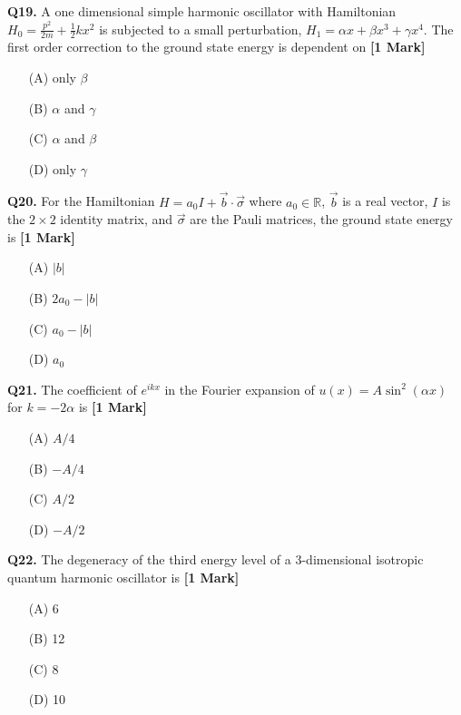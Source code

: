 \documentclass[11pt]{article}
\newcommand{\questiona}[2]{
    \noindent\textbf{Q#2.} #1 \hfill \textbf{[1 Mark]}
}
\begin{document}
\questiona{A one dimensional simple harmonic oscillator with Hamiltonian \( H_0 = \frac{p^2}{2m} + \frac{1}{2}kx^2 \) is subjected to a small perturbation, \( H_1 = \alpha x + \beta x^3 + \gamma x^4 \). The first order correction to the ground state energy is dependent on}{19}
\begin{enumerate}
    \item[(A)] only \( \beta \)
    \item[(B)] \( \alpha \) and \( \gamma \)
    \item[(C)] \( \alpha \) and \( \beta \)
    \item[(D)] only \( \gamma \)
\end{enumerate}
\vspace{0.5cm}

\questiona{For the Hamiltonian \( H = a_0 I + \vec{b} \cdot \vec{\sigma} \) where \( a_0 \in \mathbb{R} \), \( \vec{b} \) is a real vector, \( I \) is the \( 2 \times 2 \) identity matrix, and \( \vec{\sigma} \) are the Pauli matrices, the ground state energy is}{20}
\begin{enumerate}
    \item[(A)] \( |b| \)
    \item[(B)] \( 2a_0 - |b| \)
    \item[(C)] \( a_0 - |b| \)
    \item[(D)] \( a_0 \)
\end{enumerate}
\vspace{0.5cm}

\questiona{The coefficient of \( e^{ikx} \) in the Fourier expansion of \( u(x) = A \sin^2 (\alpha x) \) for \( k = -2\alpha \) is}{21}
\begin{enumerate}
    \item[(A)] \( A/4 \)
    \item[(B)] \( -A/4 \)
    \item[(C)] \( A/2 \)
    \item[(D)] \( -A/2 \)
\end{enumerate}
\vspace{0.5cm}

\questiona{The degeneracy of the third energy level of a 3-dimensional isotropic quantum harmonic oscillator is}{22}
\begin{enumerate}
    \item[(A)] 6
    \item[(B)] 12
    \item[(C)] 8
    \item[(D)] 10
\end{enumerate}
\vspace{0.5cm}
\end{document}
